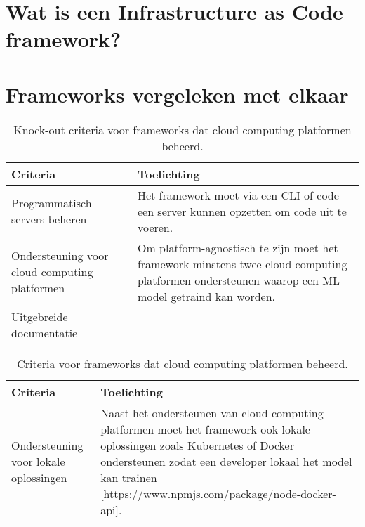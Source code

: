 
\section{Wat is een Infrastructure as Code framework?}\label{sec:wat-is-een-infrastructure-as-code-framework}

\section{Frameworks vergeleken met elkaar}\label{sec:frameworks-vergeleken-met-elkaar}


\begin{table}[hbt!]
  \centering
  \begin{tabular}{|p{.2\linewidth}|p{.69\linewidth}|}
  \hline
  \textbf{Criteria} & \textbf{Toelichting} \\ \hline
    Programmatisch servers beheren
    &
    Het framework moet via een CLI of code een server kunnen opzetten om code uit te voeren. 
    \\ \hline

    Ondersteuning voor cloud \newline computing \newline platformen
    &
    Om platform-agnostisch te zijn moet het framework minstens twee cloud computing platformen ondersteunen waarop een ML model getraind kan worden.
    \\ \hline

    Uitgebreide documentatie
    &
    
    \\ \hline
  \end{tabular}
  \caption{Knock-out criteria voor frameworks dat cloud computing platformen beheerd.}
  \label{table:knock-out-criteria-framworks-that-manage-cloud-computing-platformen}
\end{table}

\begin{table}[hbt!]
  \centering
  \begin{tabular}{|p{.2\linewidth}|p{.69\linewidth}|}
  \hline
  \textbf{Criteria} & \textbf{Toelichting} \\ \hline
    Ondersteuning voor lokale \newline oplossingen
    &
    Naast het ondersteunen van cloud computing platformen moet het framework ook lokale oplossingen zoals Kubernetes of Docker ondersteunen zodat een developer lokaal het model kan trainen [https://www.npmjs.com/package/node-docker-api].
    \\ \hline
  \end{tabular}
  \caption{Criteria voor frameworks dat cloud computing platformen beheerd.}
  \label{table:criteria-framworks-that-manage-cloud-computing-platformen}
\end{table}

